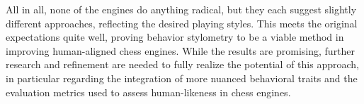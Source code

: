 All in all, none of the engines do anything radical, but they each suggest slightly different approaches, reflecting the desired playing styles.
This meets the original expectations quite well, proving behavior stylometry to be a viable method in improving human-aligned chess engines.
While the results are promising, further research and refinement are needed to fully realize the potential of this approach, in particular regarding the integration of more nuanced behavioral traits and the evaluation metrics used to assess human-likeness in chess engines.